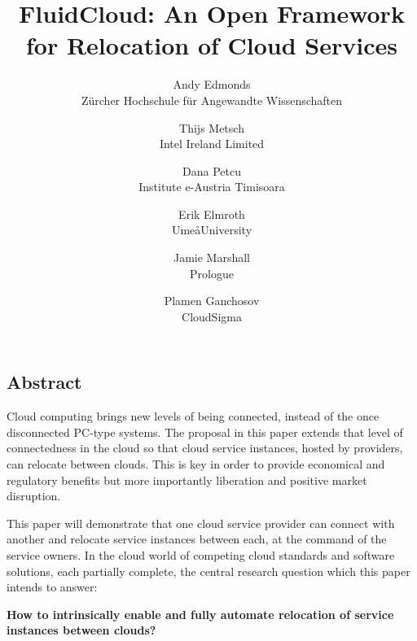 \documentclass[letterpaper,twocolumn,10pt]{article}
\begin{document}
\date{}

\title{\Large \bf FluidCloud: An Open Framework for Relocation of Cloud Services}

\author{
{\rm Andy Edmonds}\\
Z\"urcher Hochschule f\"ur Angewandte Wissenschaften
\and
{\rm Thijs Metsch}\\
Intel Ireland Limited
\and
{\rm Dana Petcu}\\
Institute e-Austria Timisoara
\and
{\rm Erik Elmroth}\\
Ume\aa University
\and
{\rm Jamie Marshall}\\
Prologue
\and
{\rm Plamen Ganchosov}\\
CloudSigma
}

\maketitle


\subsection*{Abstract}

Cloud computing brings new levels of being connected, instead of the once disconnected 
PC-type systems. The proposal in this paper extends that level of connectedness in the cloud so that 
cloud service instances, hosted by providers, can relocate between clouds. This is key in order to 
provide economical and regulatory benefits but more importantly liberation and positive market disruption.

This paper will demonstrate that one cloud service provider can connect with another and 
relocate service instances between each, at the command of the service owners. In the cloud world of 
competing cloud standards and software solutions, each partially complete, the central research 
question which this paper intends to answer:

\textbf{How to intrinsically enable and fully automate relocation of service instances between clouds?}
\end{document}
